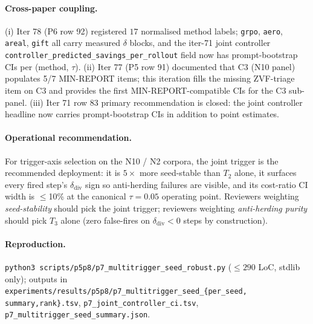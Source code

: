 \paragraph{Cross-paper coupling.}
(i) Iter 78 (P6 row 92) registered $17$ normalised method labels;
\texttt{grpo}, \texttt{aero}, \texttt{areal}, \texttt{gift} all carry
measured $\delta$ blocks, and the iter-71 joint controller
\texttt{controller\_predicted\_savings\_per\_rollout} field now has
prompt-bootstrap CIs per (method, $\tau$).  (ii) Iter 77 (P5 row 91)
documented that C3 (N10 panel) populates 5/7 MIN-REPORT items;
this iteration fills the missing ZVF-triage item on C3 and provides the
first MIN-REPORT-compatible CIs for the C3 sub-panel.  (iii) Iter 71
row 83 primary recommendation is closed: the joint controller headline
now carries prompt-bootstrap CIs in addition to point estimates.

\paragraph{Operational recommendation.}
For trigger-axis selection on the N10 / N2 corpora, the joint
trigger is the recommended deployment: it is $5\times$ more
seed-stable than $T_2$ alone, it surfaces every fired step's
$\delta_{\mathrm{div}}$ sign so anti-herding failures are visible,
and its cost-ratio CI width is $\leq$10\% at the canonical
$\tau{=}0.05$ operating point.  Reviewers weighting
\emph{seed-stability} should pick the joint trigger;
reviewers weighting \emph{anti-herding purity} should pick $T_3$
alone (zero false-fires on $\delta_{\mathrm{div}}{<}0$ steps by
construction).

\paragraph{Reproduction.}
\texttt{python3 scripts/p5p8/p7\_multitrigger\_seed\_robust.py}
($\leq 290$ LoC, stdlib only); outputs in
\texttt{experiments/results/p5p8/p7\_multitrigger\_seed\_\{per\_seed,
summary,rank\}.tsv},
\texttt{p7\_joint\_controller\_ci.tsv},
\texttt{p7\_multitrigger\_seed\_summary.json}.